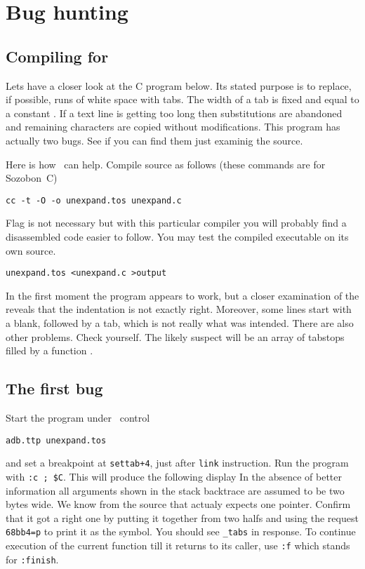 \section{Bug hunting}

\subsection{Compiling for \szadb{}}
Lets have a closer look at the C program below.  Its stated purpose is to
replace, if possible, runs of white space with tabs.  The width of a tab
is fixed and equal to a constant .  If a text line is 
getting too long then substitutions are abandoned and remaining
characters are copied without modifications.
\bigskip
{}
\bigskip
\noindent
This program has actually two bugs.
See if you can find them just examinig the source.

Here is how \szadb\ can help. Compile source as follows
(these commands are for Sozobon~C)
\begin{exmpl}
	{\tt cc -t -O -o unexpand.tos unexpand.c}
\end{exmpl}
Flag  is not necessary but with this particular compiler
you will probably find a disassembled code easier to follow.
You may test the compiled executable on its own source.
\begin{exmpl}
	{\tt unexpand.tos <unexpand.c >output }
\end{exmpl}
In the first moment the program appears to work, but a closer examination
of the  reveals that the indentation is not exactly right.
Moreover, some lines start with a blank, followed by a tab, which is
not really what was intended.
There are also other problems.  Check yourself.
The likely suspect will be an array  of tabstops filled by
a function .

\subsection{The first bug}
Start the program under \szadb\ control
\begin{exmpl}
	{\tt adb.ttp unexpand.tos}
\end{exmpl}
and set a breakpoint at \verb|settab+4|, just after {\tt link} instruction.
Run the program with \verb|:c ; $C|. This will produce the following
display
In the absence of better information all arguments 
shown in the stack backtrace are assumed to be two bytes wide.  
We know from the source that  actualy
expects one pointer.
Confirm that it got a right one by putting it together from two halfs
and using the request \verb|68bb4=p| to print it as the symbol.
You should see \verb|_tabs| in response.
To continue execution of the current function 
till it returns to its caller, use {\tt :f} which stands for {\tt :finish}.

